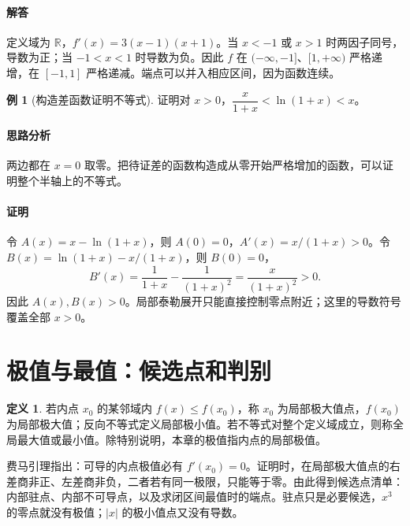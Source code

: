 \documentclass[UTF8,fontset=fandol,12pt,oneside,openany]{ctexrep}
\newcommand{\R}{\mathbb R}
\theoremstyle{definition}
\newtheorem{definition}[theorem]{定义}
\newtheorem{example}{例}[chapter]
\begin{document}
\paragraph{解答}定义域为 $\R$，$f'(x)=3(x-1)(x+1)$。当 $x<-1$ 或 $x>1$ 时两因子同号，导数为正；当 $-1<x<1$ 时导数为负。因此 $f$ 在 $(-\infty,-1]$、$[1,+\infty)$ 严格递增，在 $[-1,1]$ 严格递减。端点可以并入相应区间，因为函数连续。

\begin{example}[构造差函数证明不等式]
证明对 $x>0$，$\dfrac{x}{1+x}<\ln(1+x)<x$。
\end{example}
\paragraph{思路分析}两边都在 $x=0$ 取零。把待证差的函数构造成从零开始严格增加的函数，可以证明整个半轴上的不等式。
\paragraph{证明}令 $A(x)=x-\ln(1+x)$，则 $A(0)=0$，$A'(x)=x/(1+x)>0$。令 $B(x)=\ln(1+x)-x/(1+x)$，则 $B(0)=0$，
\[ B'(x)=\frac1{1+x}-\frac1{(1+x)^2}=\frac{x}{(1+x)^2}>0. \]
因此 $A(x),B(x)>0$。局部泰勒展开只能直接控制零点附近；这里的导数符号覆盖全部 $x>0$。

\section{极值与最值：候选点和判别}
\label{lec:09:extrema}
\begin{definition}
若内点 $x_0$ 的某邻域内 $f(x)\le f(x_0)$，称 $x_0$ 为局部极大值点，$f(x_0)$ 为局部极大值；反向不等式定义局部极小值。若不等式对整个定义域成立，则称全局最大值或最小值。除特别说明，本章的极值指内点的局部极值。
\end{definition}
费马引理指出：可导的内点极值必有 $f'(x_0)=0$。证明时，在局部极大值点的右差商非正、左差商非负，二者若有同一极限，只能等于零。由此得到候选点清单：内部驻点、内部不可导点，以及求闭区间最值时的端点。驻点只是必要候选，$x^3$ 的零点就没有极值；$|x|$ 的极小值点又没有导数。
\end{document}
